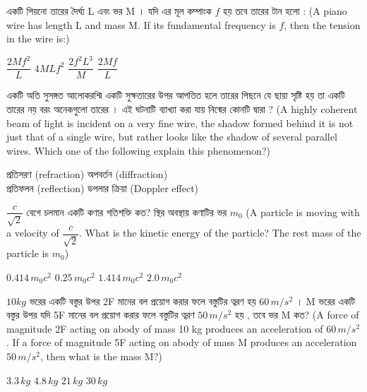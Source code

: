 \documentclass[addpoints]{exam}
\begin{document}
\begin{questions}
\question  একটি পিয়নো তারের দৈর্ঘ্য L এবং ভর M । যদি এর মূল কম্পাংক $ f $ হয় তবে তারের টান হলো : (A piano wire has length L and mass M. If its fundamental frequency is $ f $, then the tension in the wire is:)

\begin{oneparchoices}
\choice $ \dfrac{2Mf^{2}}{L} $
\choice $ 4MLf^{2} $
\choice $ \dfrac{2f^{2}L^{3}}{M} $
\choice $ \dfrac{2Mf}{L} $

\end{oneparchoices}


\question  একটি অতি সুসঙ্গত আলোকরশ্মি একটি সুক্ষতারের উপর আপতিত হলে তারের পিছনে যে ছায়া সৃষ্টি হয় তা একটি তারের নয় বরং অনেকগুলো তারের । এই ঘটনাটি ব্যাখ্যা করা যায় নিন্মের কোনটি দ্বারা ? (A highly coherent beam of light is incident on a very fine wire, the shadow formed behind it is not just that of a single wire, but rather looks like the shadow of several parallel wires. Which one of the following explain this phenomenon?)

\begin{oneparchoices}
\choice  প্রতিসরণ (refraction)
\choice  অপবর্তন (diffraction)\\
\hspace*{-.33cm}\choice  প্রতিফলন (reflection)
\choice  ডপলার ক্রিয়া (Doppler effect)
\end{oneparchoices}

\question  $ \dfrac{c}{\sqrt{2}} $ বেগে চলমান একটি কণার গতিশক্তি কত? স্থির অবস্থায় কণাটির ভর $ m_{0} $ (A particle is moving with a velocity of $ \dfrac{c}{\sqrt{2}} $. What is the kinetic energy of the particle? The rest mass of the particle is $ m_{0} $)

\begin{oneparchoices}
\choice $ 0.414\,m_{0}c^{2} $
\choice $ 0.25\,m_{0}c^{2} $
\choice $ 1.414\,m_{0}c^{2} $
\choice $ 2.0\,m_{0}c^{2} $

\end{oneparchoices}

\question  $ 10kg $ ভরের একটি বস্তুর উপর 2F মানের বল প্রয়োগ করার ফলে বস্তুটির ত্বরণ হয় $ 60\,m/s^{2} $ । M ভরের একটি বস্তুর উপর যদি 5F মানের বল প্রয়োগ করার ফলে বস্তুটির ত্বরণ $ 50\,m/s^{2} $ হয় , তবে ভর M কত? (A force of magnitude 2F acting on abody of mass 10 kg produces an acceleration of $ 60\,m/s^{2} $. If a force of magnitude 5F acting on abody of mass M produces an acceleration $ 50\,m/s^{2} $, then what is the mass M?)

\begin{oneparchoices}
\choice $ 3.3\,kg $
\choice $ 4.8\,kg $
\choice $ 21\,kg $
\choice $ 30\,kg $


\end{oneparchoices}
\end{questions}
\end{document}
